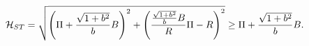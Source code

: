 \begin{equation}
\label{ST3}
{\cal H}_{ST} =
\sqrt{ \left( \Pi + \frac{\sqrt{1 + b^2}}{b} B \right)^2 +
       \left( \frac{\frac{\sqrt{1 + b^2}}{b} B}{R} \Pi - R \right)^2
     } \geq \Pi + \frac{\sqrt{1 + b^2}}{b} B.
\end{equation} 
